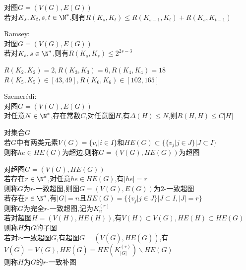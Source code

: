 \begin{dingli}
对图$G=(V(G),E(G))$\\
若对$K_{s},K_{t},s,t\in\N^*$,则有$R(K_{s},K_{t})\leq R(K_{s-1},K_{t})+R(K_{s},K_{t-1})$
\end{dingli}

\begin{dingli}
Ramsey:\\
对图$G=(V(G),E(G))$\\
若对$K_{s},s\in\N^*$,则有$R(K_s,K_s)\leq 2^{2s-3}$
\end{dingli}

\begin{zhu}
$R(K_2,K_2)=2,R(K_3,K_3)=6,R(K_4,K_4)=18$\\
$R(K_5,K_5)\in[43,49],R(K_6,K_6)\in[102,165]$
\end{zhu}

\begin{dingli}
Szemerédi:\\
对图$G=(V(G),E(G))$\\
对任意$N\in\N^*$,存在常数$C$,对任意图$H$,有$\Delta(H)\leq N$,则$R(H,H)\leq C|H|$
\end{dingli}

\begin{dingyi}
对集合$G$\\
若$G$中有两类元素$V(G)=\{v_i|i\in I\}$和$HE(G)\subset \{\{v_{j}|j\in J\}|J\subset I\}$\\
则称$he\in HE(G)$为超边,则称$G=(V(G),HE(G))$为超图
\end{dingyi}

\begin{dingyi}
对超图$G=(V(G),HE(G))$\\
若存在$r\in\N^*$,对任意$he\in HE(G)$,有$|he|=r$\\
则称$G$为$r$-一致超图,则图$G=(V(G),E(G))$为$2$-一致超图\\
若存在$r\in\N^*$,有$|G|=n$且$HE(G)=\{\{v_{j}|j\in J\}|J\subset I,|J|=r\}$\\
则称$G$为完全$r$-一致超图,记为$K_{n}^{(r)}$\\
若对超图$H=(V(H),HE(H))$,有$V(H)\subset V(G),HE(H)\subset HE(G)$\\
则称$H$为$G$的子图\\
若对$r$-一致超图$G$,有超图$\overline{G}=(V(\overline{G}),HE(\overline{G}))$,有$V(\overline{G})=V(G),HE(\overline{G})=HE(K_{|G|}^{(r)})\backslash HE(G)$\\
则称$H$为$G$的$r$-一致补图
\end{dingyi}

